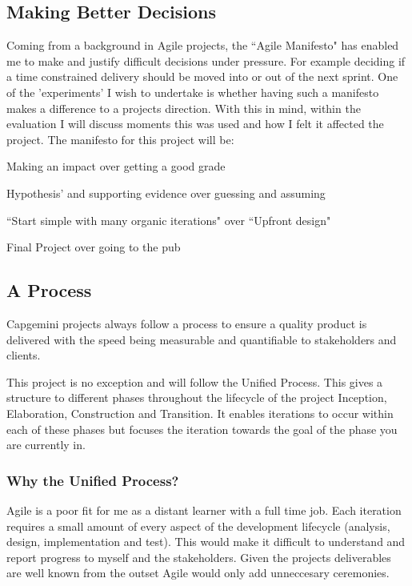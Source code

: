 \subsection{Making Better Decisions}
\label{sec:manifesto}
Coming from a background in Agile projects, the ``Agile Manifesto" \citep{AgileManifesto} has
enabled
me to make and justify difficult decisions under pressure. For example deciding
 if a time constrained delivery should be moved into or out of the next
 sprint. One of the 'experiments' I wish to undertake is whether having such a
 manifesto makes a difference to a projects direction. With this in mind,
 within the evaluation I will discuss moments this was used and how I felt
 it affected the project. The manifesto for this project will be:

\begin{center}
Making an impact over getting a good grade

Hypothesis’ and supporting evidence over guessing and assuming

``Start simple with many organic iterations" over ``Upfront design"

Final Project over going to the pub
\end{center}

\subsection{A Process}
Capgemini projects always follow a process \citep{CapgeminiSustain} to ensure a
quality
product is delivered with the speed being measurable and quantifiable to
stakeholders and clients.

This project is no exception and will follow the Unified Process. This gives
a structure to different phases throughout the lifecycle of
the project Inception, Elaboration, Construction and Transition. It enables
iterations to occur within each of these phases but focuses the iteration
towards the goal of the phase you are currently in.

\subsubsection{Why the Unified Process?}

Agile is a poor fit for me as a distant learner with a
full time job. Each iteration requires a small amount of every aspect of the
development lifecycle (analysis, design, implementation and test). This would
make it difficult to understand and report progress to myself and the
stakeholders. Given the projects deliverables are well known from
the outset Agile would only add unneccesary ceremonies.

